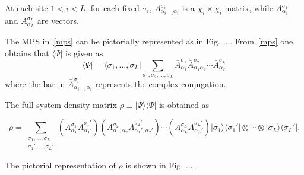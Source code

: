 \documentclass[twocolumn,superscriptaddress,prb,10pt]{revtex4-1}
\begin{document}
At each site $1<i<L$, for each fixed $\sigma_i$, $A^{\sigma_i}_{\alpha_{i-1}\alpha_i}$ 
is a $\chi_i\times\chi_i$ matrix, while $A^{\sigma_1}_{\alpha_1}$ and 
$A^{\sigma_L}_{\alpha_L}$ are vectors. 

The MPS in~\eqref{mps} can be pictorially represented as in Fig. .... From~\eqref{mps} 
one obtains that $\langle\Psi|$ is given as 
%
\begin{equation}
\langle\Psi|=\langle\sigma_1,\dots,\sigma_L| \sum\limits_{\sigma_1,\sigma_2,
\dots,\sigma_L}\bar A^{\sigma_1}_{\alpha_1}\bar A^{\sigma_2}_{\alpha_1\alpha_2}\cdots 
\bar A^{\sigma_L}_{\alpha_L}
\label{mps_conj} 
\end{equation}
%
where the bar in $\bar A^{\sigma_i}_{\alpha_{i-1}\alpha_i}$ represents the complex 
conjugation. 

The full system density matrix $\rho\equiv|\Psi\rangle\langle\Psi|$ is obtained as
%
\begin{widetext}
%
\begin{equation}
\rho=\sum\limits_{\substack{\sigma_1,\dots,\sigma_L\\\sigma_1',\dots,\sigma_L'}}
(A^{\sigma_1}_{\alpha_1}\bar A^{\sigma_1'}_{\alpha_1'})(A^{\sigma_2}_{\alpha_1,\alpha_2}
\bar A^{\sigma_2'}_{\alpha_1',\alpha_2'})\cdots (A^{\sigma_L}_{\alpha_L}
\bar A^{\sigma_L'}_{\alpha_L'})|\sigma_1\rangle\langle\sigma_1'|\otimes\cdots\otimes
|\sigma_L\rangle\langle\sigma_L'|. 
\end{equation}
%
\end{widetext}
%
The pictorial representation of $\rho$ is shown in Fig. ... . 
\end{document}
